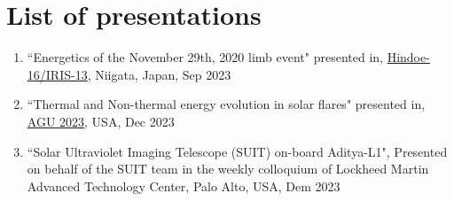 \documentclass[a4paper,11pt]{article}
\begin{document}



\section*{List of presentations}
\begin{enumerate} 
    \item ``Energetics of the November 29th, 2020 limb event" presented in,  \href{https://hinode.nao.ac.jp/hinode16_iris13/#index}{Hindoe-16/IRIS-13}, Niigata, Japan, Sep 2023
    \item ``Thermal and Non-thermal energy evolution in solar flares" presented in, \href{https://www.agu.org/fall-meeting}{AGU 2023}, USA, Dec 2023
    \item ``Solar Ultraviolet Imaging Telescope (SUIT) on-board Aditya-L1", Presented on behalf of the SUIT team in the weekly colloquium of Lockheed Martin Advanced Technology Center, Palo Alto, USA, Dem 2023
\end{enumerate}

\newpage
{}

\end{document}
